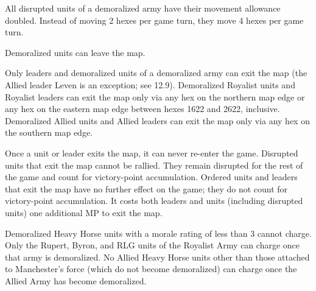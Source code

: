  All disrupted units of a demoralized army have their movement allowance doubled. Instead of moving 2 hexes per game turn, they move 4 hexes per game turn.

 Demoralized units can leave the map.

Only leaders and demoralized units of a demoralized army can exit the map (the Allied leader Leven is an exception; see 12.9). Demoralized Royalist units and Royalist leaders can exit the map only via any hex on the northern map edge or any hex on the eastern map edge between hexes 1622 and 2622, inclusive. Demoralized Allied units and Allied leaders can exit the map only via any hex on the southern map edge.

Once a unit or leader exits the map, it can never re-enter the game. Disrupted units that exit the map cannot be rallied. They remain disrupted for the rest of the game and count for victory-point accumulation. Ordered units and leaders that exit the map have no further effect on the game; they do not count for victory-point accumulation. It costs both leaders and units (including disrupted units) one additional MP to exit the map.

 Demoralized Heavy Horse units with a morale rating of less than 3 cannot charge. Only the Rupert, Byron, and RLG units of the Royalist Army can charge once that army is demoralized. No Allied Heavy Horse units other than those attached to Manchester's force (which do not become demoralized) can charge once the Allied Army has become demoralized.

